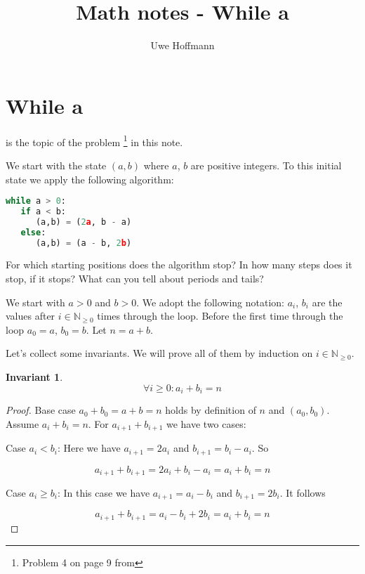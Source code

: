 

\title{Math notes - While a}
\author{Uwe Hoffmann}

\newtheorem{thminv}{Invariant}[chapter] 



\setcounter{chapter}{1}
\section*{While a}

 is the topic of the problem \footnote{Problem 4 on page 9 from } in this note.


\vspace{10 mm}
\begin{problem}
We start with the state $(a, b)$ where $a$, $b$ are positive integers. To this initial state we apply the following algorithm:

\begin{lstlisting}[language=Python, basicstyle=\small, label={lst:while_loop}, frame=trBL]
while a > 0:
   if a < b:
      (a,b) = (2a, b - a)
   else:
      (a,b) = (a - b, 2b) 
\end{lstlisting}

For which starting positions does the algorithm stop? In how many steps does it stop,
if it stops? What can you tell about periods and tails?

\end{problem}

We start with $a > 0$ and $b > 0$. We adopt the following notation: $a_i$, $b_i$ are the values after $i \in \mathbb{N}_{\geq 0}$ times through the loop. Before the first time through the loop $a_0 = a$, $b_0 = b$. Let $n = a + b$.

Let's collect some invariants. We will prove all of them by induction on $i \in \mathbb{N}_{\geq 0}$.

\begin{thminv}\label{p1}
$$
  \forall i \geq 0: a_i + b_i = n
$$
\end{thminv}

\begin{proof}
Base case $a_0 + b_0 = a + b = n$ holds by definition of $n$ and $(a_0, b_0)$.
Assume $a_i + b_i = n$. For $a_{i+1} + b_{i+1}$ we have two cases:

Case $a_i < b_i$: Here we have $a_{i+1} = 2 a_i$ and $b_{i+1} = b_i - a_i$. So

$$
a_{i+1} + b_{i+1} = 2 a_i + b_i - a_i = a_i + b_i = n
$$

Case $a_i \geq b_i$: In this case we have  $a_{i+1} = a_i - b_i$ and $b_{i+1} = 2 b_i$. It follows

$$
a_{i+1} + b_{i+1} = a_i - b_i + 2 b_i = a_i + b_i = n
$$

\end{proof}

